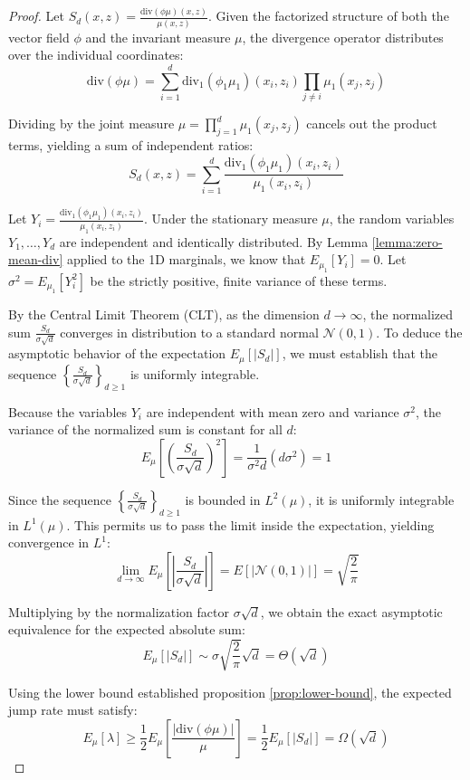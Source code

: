 \documentclass[10pt,a4paper]{amsart}
\begin{document}
\begin{proof}
    Let $S_d(x,z) = \frac{\text{div}(\phi \mu)(x,z)}{\mu(x,z)}$. Given the factorized structure of both the vector field $\phi$ and the invariant measure $\mu$, the divergence operator distributes over the individual coordinates:
    $$ \text{div}(\phi\mu) = \sum_{i=1}^d \text{div}_1(\phi_1 \mu_1)(x_i, z_i) \prod_{j \neq i} \mu_1(x_j, z_j) $$

    Dividing by the joint measure $\mu = \prod_{j=1}^d \mu_1(x_j, z_j)$ cancels out the product terms, yielding a sum of independent ratios:
    $$ S_d(x,z) = \sum_{i=1}^d \frac{\text{div}_1(\phi_1 \mu_1)(x_i, z_i)}{\mu_1(x_i, z_i)} $$

    Let $Y_i = \frac{\text{div}_1(\phi_1 \mu_1)(x_i, z_i)}{\mu_1(x_i, z_i)}$. Under the stationary measure $\mu$, the random variables $Y_1, \dots, Y_d$ are independent and identically distributed. By Lemma \ref{lemma:zero-mean-div} applied to the 1D marginals, we know that $E_{\mu_1}[Y_i] = 0$. Let $\sigma^2 = E_{\mu_1}[Y_i^2]$ be the strictly positive, finite variance of these terms.

    By the Central Limit Theorem (CLT), as the dimension $d \to \infty$, the normalized sum $\frac{S_d}{\sigma \sqrt{d}}$ converges in distribution to a standard normal $\mathcal{N}(0, 1)$. To deduce the asymptotic behavior of the expectation $E_\mu[|S_d|]$, we must establish that the sequence $\left\{ \frac{S_d}{\sigma \sqrt{d}} \right\}_{d \ge 1}$ is uniformly integrable. 

    Because the variables $Y_i$ are independent with mean zero and variance $\sigma^2$, the variance of the normalized sum is constant for all $d$:
    $$ E_\mu\left[ \left( \frac{S_d}{\sigma \sqrt{d}} \right)^2 \right] = \frac{1}{\sigma^2 d} (d \sigma^2) = 1 $$

    Since the sequence $\left\{ \frac{S_d}{\sigma \sqrt{d}} \right\}_{d \ge 1}$ is bounded in $L^2(\mu)$, it is uniformly integrable in $L^1(\mu)$. This permits us to pass the limit inside the expectation, yielding convergence in $L^1$:
    $$ \lim_{d \to \infty} E_\mu\left[ \left| \frac{S_d}{\sigma \sqrt{d}} \right| \right] = E[|\mathcal{N}(0, 1)|] = \sqrt{\frac{2}{\pi}} $$

    Multiplying by the normalization factor $\sigma \sqrt{d}$, we obtain the exact asymptotic equivalence for the expected absolute sum:
    $$ E_\mu[|S_d|] \sim \sigma \sqrt{\frac{2}{\pi}} \sqrt{d} = \Theta(\sqrt{d}) $$

    Using the lower bound established proposition \ref{prop:lower-bound}, the expected jump rate must satisfy:
    $$ E_\mu[\lambda] \geq \frac{1}{2} E_\mu\left[ \frac{|\text{div}(\phi \mu)|}{\mu} \right] = \frac{1}{2} E_\mu[|S_d|] = \Omega(\sqrt{d}) $$


\end{proof}
\end{document}
